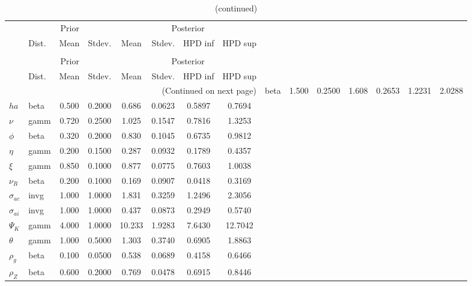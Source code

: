  
\begin{center}
\begin{longtable}{llcccccc} 
\caption{Results from Metropolis-Hastings (parameters)}
 \label{Table:MHPosterior:1}\\
\toprule 
  & \multicolumn{3}{c}{Prior}  &  \multicolumn{4}{c}{Posterior} \\
  \cmidrule(r{.75em}){2-4} \cmidrule(r{.75em}){5-8}
  & Dist. & Mean  & Stdev. & Mean & Stdev. & HPD inf & HPD sup\\
\midrule \endfirsthead 
\caption{(continued)}\\\toprule 
  & \multicolumn{3}{c}{Prior}  &  \multicolumn{4}{c}{Posterior} \\
  \cmidrule(r{.75em}){2-4} \cmidrule(r{.75em}){5-8}
  & Dist. & Mean  & Stdev. & Mean & Stdev. & HPD inf & HPD sup\\
\midrule \endhead 
\bottomrule \multicolumn{8}{r}{(Continued on next page)} \endfoot 
\bottomrule \endlastfoot 
${\sigma}$ & beta &   1.500 & 0.2500 &   1.608& 0.2653 &  1.2231 &  2.0288 \\ 
${ha}$ & beta &   0.500 & 0.2000 &   0.686& 0.0623 &  0.5897 &  0.7694 \\ 
$\nu$ & gamm &   0.720 & 0.2500 &   1.025& 0.1547 &  0.7816 &  1.3253 \\ 
${\phi}$ & beta &   0.320 & 0.2000 &   0.830& 0.1045 &  0.6735 &  0.9812 \\ 
${\eta}$ & gamm &   0.200 & 0.1500 &   0.287& 0.0932 &  0.1789 &  0.4357 \\ 
$\xi$ & gamm &   0.850 & 0.1000 &   0.877& 0.0775 &  0.7603 &  1.0038 \\ 
${\nu_R}$ & beta &   0.200 & 0.1000 &   0.169& 0.0907 &  0.0418 &  0.3169 \\ 
${\sigma_{ac}}$ & invg &   1.000 & 1.0000 &   1.831& 0.3259 &  1.2496 &  2.3056 \\ 
${\sigma_{ai}}$ & invg &   1.000 & 1.0000 &   0.437& 0.0873 &  0.2949 &  0.5740 \\ 
${\Psi_{K}}$ & gamm &   4.000 & 1.0000 &  10.233& 1.9283 &  7.6430 & 12.7042 \\ 
${\theta}$ & gamm &   1.000 & 0.5000 &   1.303& 0.3740 &  0.6905 &  1.8863 \\ 
${\rho_g}$ & beta &   0.100 & 0.0500 &   0.538& 0.0689 &  0.4158 &  0.6466 \\ 
${\rho_Z}$ & beta &   0.600 & 0.2000 &   0.769& 0.0478 &  0.6915 &  0.8446 \\ 

\end{longtable}
\end{center}
